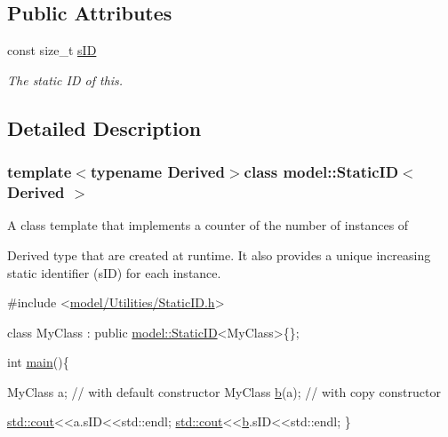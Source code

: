 \subsection*{Public Attributes}
\begin{DoxyCompactItemize}
\item 
const size\+\_\+t \hyperlink{classmodel_1_1_static_i_d_a91e91a4c43dc2cb6259f58bdceb686a5}{s\+I\+D}
\begin{DoxyCompactList}\small\item\em The static I\+D of this. \end{DoxyCompactList}\end{DoxyCompactItemize}


\subsection{Detailed Description}
\subsubsection*{template$<$typename Derived$>$class model\+::\+Static\+I\+D$<$ Derived $>$}

\begin{DoxyVerb}A class template that implements a counter of the number of instances of
\end{DoxyVerb}
 Derived type that are created at runtime. It also provides a unique increasing static identifier (s\+I\+D) for each instance. 


\begin{DoxyCode}
\textcolor{preprocessor}{#include <\hyperlink{_static_i_d_8h}{model/Utilities/StaticID.h}>}

\textcolor{keyword}{class }MyClass : \textcolor{keyword}{public} \hyperlink{classmodel_1_1_static_i_d}{model::StaticID}<MyClass>\{\};

\textcolor{keywordtype}{int} \hyperlink{bench_2bary_search_2main_8cpp_a0ddf1224851353fc92bfbff6f499fa97}{main}()\{

MyClass a;          \textcolor{comment}{// with default constructor}
MyClass \hyperlink{run_multipole_8m_a21ad0bd836b90d08f4cf640b4c298e7c}{b}(a);       \textcolor{comment}{// with copy constructor}

\hyperlink{namespacemodel_a0ce25fef078a7d9d9cb7cfbabcfbc289}{std::cout}<<a.sID<<std::endl;
\hyperlink{namespacemodel_a0ce25fef078a7d9d9cb7cfbabcfbc289}{std::cout}<<\hyperlink{run_multipole_8m_a21ad0bd836b90d08f4cf640b4c298e7c}{b}.sID<<std::endl;
\}
\end{DoxyCode}
 

